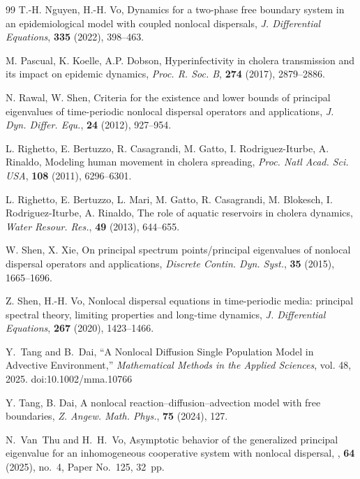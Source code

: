 \documentclass[a4paper,11pt]{amsart}
\theoremstyle{definition}
\numberwithin{equation}{section}
\theoremstyle{definition}
\begin{document}
\begin{thebibliography}{99}
T.-H. Nguyen, H.-H. Vo,
Dynamics for a two-phase free boundary system in an epidemiological model with coupled nonlocal dispersals,
\textit{J. Differential Equations}, \textbf{335} (2022), 398--463.

M. Pascual, K. Koelle, A.P. Dobson,
Hyperinfectivity in cholera transmission and its impact on epidemic dynamics,
\textit{Proc. R. Soc. B}, \textbf{274} (2017), 2879--2886.



N. Rawal, W. Shen,
Criteria for the existence and lower bounds of principal eigenvalues of time-periodic nonlocal dispersal operators and applications,
\textit{J. Dyn. Differ. Equ.}, \textbf{24} (2012), 927--954.

L. Righetto, E. Bertuzzo, R. Casagrandi, M. Gatto, I. Rodriguez-Iturbe, A. Rinaldo,
Modeling human movement in cholera spreading,
\textit{Proc. Natl Acad. Sci. USA}, \textbf{108} (2011), 6296--6301.




L. Righetto, E. Bertuzzo, L. Mari, M. Gatto, R. Casagrandi, M. Blokesch, I. Rodriguez-Iturbe, A. Rinaldo,
The role of aquatic reservoirs in cholera dynamics,
\textit{Water Resour. Res.}, \textbf{49} (2013), 644--655.

W. Shen, X. Xie,
On principal spectrum points/principal eigenvalues of nonlocal dispersal operators and applications,
\textit{Discrete Contin. Dyn. Syst.}, \textbf{35} (2015), 1665--1696.

Z. Shen, H.-H. Vo,
Nonlocal dispersal equations in time-periodic media: principal spectral theory, limiting properties and long-time dynamics,
\textit{J. Differential Equations}, \textbf{267} (2020), 1423--1466.

Y.~Tang and B.~Dai, “A Nonlocal Diffusion Single Population Model in Advective Environment,” \textit{Mathematical Methods in the Applied Sciences}, vol. 48,  2025. doi:10.1002/mma.10766



Y. Tang, B. Dai,
A nonlocal reaction--diffusion--advection model with free boundaries,
\textit{Z. Angew. Math. Phys.}, \textbf{75} (2024), 127.




N.~Van~Thu and H.~H.~Vo,
\newblock Asymptotic behavior of the generalized principal eigenvalue for an inhomogeneous cooperative system with nonlocal dispersal,
, \textbf{64} (2025), no.~4, Paper No.~125, 32~pp.


\end{thebibliography}
\end{document}
